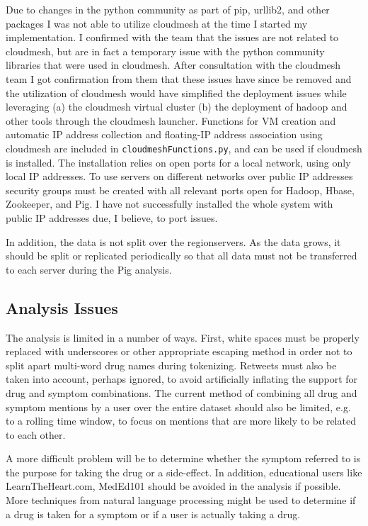 \documentclass[letterpaper]{article}
\begin{document}
Due to changes in the python community as part of pip, urllib2, and other packages I was not able to utilize cloudmesh at the time I started my implementation. I confirmed with the team that the issues are not related to cloudmesh, but are in fact a temporary issue with the python community libraries that were used in cloudmesh. After consultation with the cloudmesh team I got confirmation from them that these issues have since be removed and the utilization of cloudmesh would have simplified the deployment issues while leveraging (a) the cloudmesh virtual cluster (b) the deployment of hadoop and other tools through the cloudmesh launcher. Functions for VM creation and automatic IP address collection and floating-IP address association using cloudmesh are included in \lstinline|cloudmeshFunctions.py|, and can be used if cloudmesh is installed. The installation relies on open ports for a local network, using only local IP addresses. To use servers on different networks over public IP addresses security groups must be created with all relevant ports open for Hadoop, Hbase, Zookeeper, and Pig. I have not successfully installed the whole system with public IP addresses due, I believe, to port issues.

In addition, the data is not split over the regionservers. As the data grows, it should be split or replicated periodically so that all data must not be transferred to each server during the Pig analysis.

\subsection{Analysis Issues}
The analysis is limited in a number of ways. First, white spaces must be properly replaced with underscores or other appropriate escaping method in order not to split apart multi-word drug names during tokenizing. Retweets must also be taken into account, perhaps ignored, to avoid artificially inflating the support for drug and symptom combinations. The current method of combining all drug and symptom mentions by a user over the entire dataset should also be limited, e.g. to a rolling time window, to focus on mentions that are more likely to be related to each other.

A more difficult problem will be to determine whether the symptom referred to is the purpose for taking the drug or a side-effect. In addition, educational users like LearnTheHeart.com, MedEd101 should be avoided in the analysis if possible. More techniques from natural language processing might be used to determine if a drug is taken for a symptom or if a user is actually taking a drug. 
\end{document}
